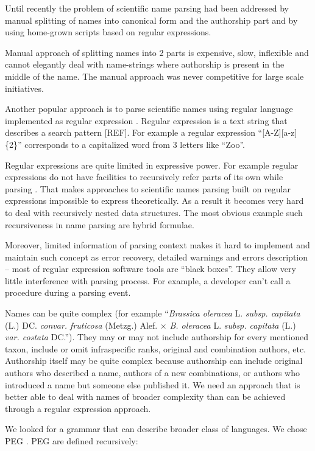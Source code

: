 \documentclass{bmcart}
\begin{document}
Until recently the problem of scientific name parsing had been addressed by
manual splitting of names into canonical form and the authorship part and
by using home-grown scripts based on regular expressions.

Manual approach of splitting names into 2 parts is expensive, slow, inflexible
and cannot elegantly deal with name-strings where authorship is present in the
middle of the name. The manual approach was never competitive for large scale
initiatives.

Another popular approach is to parse scientific names using regular language
implemented as regular expression \cite{aho1992foundations}. Regular
expression is a text string that describes a search pattern [REF]. For example
a regular expression ``[A-Z][a-z]\{2\}'' corresponds to a capitalized word
from 3 letters like ``Zoo''.

Regular expressions are quite limited in expressive power. For example regular
expressions do not have facilities to recursively refer parts of its own while
parsing \cite{yu1997handbook}. That makes approaches to scientific names
parsing built on regular expressions impossible to express theoretically. As a
result it becomes very hard to deal with recursively nested data structures.
The most obvious example such recursiveness in name parsing are hybrid
formulae.

Moreover, limited information of parsing context makes it hard to
implement and maintain such concept as error recovery, detailed warnings and
errors description -- most of regular expression software tools are ``black
boxes''. They allow very little interference with parsing process. For example,
a developer can't call a procedure during a parsing event.

Names can be quite complex (for example ``\textit{Brassica oleracea} L.
\textit{subsp.  capitata} (L.) DC. \textit{convar. fruticosa} (Metzg.) Alef.
$\times$ \textit{B. oleracea} L. \textit{subsp. capitata} (L.) \textit{var.
costata} DC.''). They may or may not include authorship for every mentioned
taxon, include or omit infraspecific ranks, original and combination authors,
etc. Authorship itself may be  quite complex because authorship can include
original authors who described a name, authors of a new combinations, or
authors who introduced a name but someone else published it. We  need an
approach that is better able to deal with names of broader complexity than can
be achieved through a regular expression approach.


We looked for a grammar that can describe broader class of languages. We chose
PEG \cite{Ford2004}. PEG are defined recursively:
\end{document}
